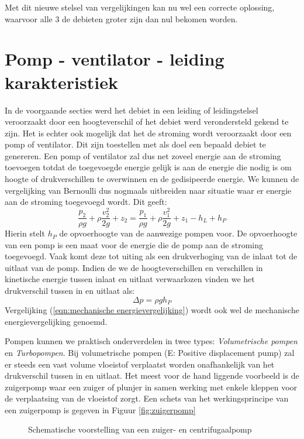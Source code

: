 Met dit nieuwe stelsel van vergelijkingen kan nu wel een correcte oplossing, waarvoor alle 3 de debieten groter zijn dan nul bekomen worden.


	\section{Pomp - ventilator - leiding karakteristiek}
	\label{sec:Pomp - ventilator - leiding karakteristiek}
In de voorgaande secties werd het debiet in een leiding of leidingstelsel veroorzaakt door een hoogteverschil of het debiet werd verondersteld gekend te zijn. Het is echter ook mogelijk dat het de stroming wordt veroorzaakt door een pomp of ventilator. Dit zijn toestellen met als doel een bepaald debiet te genereren. Een pomp of ventilator zal dus net zoveel energie aan de stroming toevoegen totdat de toegevoegde energie gelijk is aan de energie die nodig is om hoogte of drukverschillen te overwinnen en de gedisipeerde energie. We kunnen de vergelijking van Bernoulli dus nogmaals uitbreiden naar situatie waar er energie aan de stroming toegevoegd wordt. Dit geeft: 
\begin{equation}
	\frac{p_2}{\rho g} + \rho \frac{v_2^2}{2 g}  + z_2 = \frac{p_1}{\rho g} + \rho \frac{v_1^2}{2 g}  + z_1 - h_L + h_P
	\label{eqn:mechanische energievergelijking}
\end{equation}
Hierin stelt $h_P$ de opvoerhoogte van de aanwezige pompen voor. De opvoerhoogte van een pomp is een maat voor de energie die de pomp aan de stroming toegevoegd. Vaak komt deze tot uiting als een drukverhoging van de inlaat tot de uitlaat van de pomp. Indien de we de hoogteverschillen en verschillen in kinetische energie tussen inlaat en uitlaat verwaarlozen vinden we het drukverschil tussen in en uitlaat als:
\begin{equation}
	\Delta p = \rho g h_P
\end{equation}
Vergelijking (\ref{eqn:mechanische energievergelijking}) wordt ook wel de mechanische energievergelijking genoemd.

Pompen kunnen we praktisch onderverdelen in twee types: \emph{Volumetrische pompen} en \emph{Turbopompen}. Bij volumetrische pompen (E: Positive displacement pump) zal er steeds een vast volume vloeistof verplaatst worden onafhankelijk van het drukverschil tussen in en uitlaat. Het meest voor de hand liggende voorbeeld is de zuigerpomp waar een zuiger of plunjer in samen werking met enkele kleppen voor de verplaatsing van de vloeistof zorgt. Een schets van het werkingsprincipe van een zuigerpomp is gegeven in Figuur \ref{fig:zuigerpomp} 
\begin{figure}
	\centering
	\subfigure[Zuigerpomp]{
		
		\label{fig:zuigerpomp}
	} \quad
	\subfigure[Centrifugaalpomp]{
		
		\label{fig:centrifugaalpomp}
	}	
	\caption{Schematische voorstelling van een zuiger- en centrifugaalpomp}
	\label{fig:pompen}
\end{figure}

